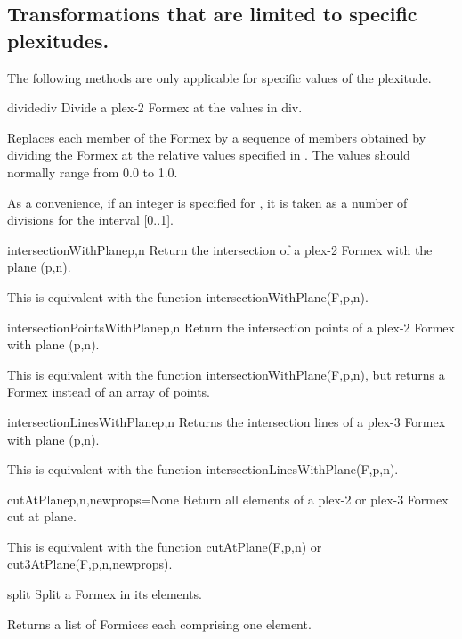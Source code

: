 \subsection{Transformations that are limited to specific plexitudes.}
The following methods are only applicable for specific values of the plexitude.


\begin{methoddesc}{divide}{div}
Divide a plex-2 Formex at the values in div.

Replaces each member of the Formex  by a sequence of members obtained
by dividing the Formex at the relative values specified in . The values
should normally range from 0.0 to 1.0.
    
As a convenience, if an integer is specified for , it is taken as a
number of divisions for the interval [0..1].
\end{methoddesc}

\begin{methoddesc}{intersectionWithPlane}{p,n}
  Return the intersection of a plex-2 Formex with the plane (p,n).
  
  This is equivalent with the function intersectionWithPlane(F,p,n).
\end{methoddesc}
    
\begin{methoddesc}{intersectionPointsWithPlane}{p,n}
  Return the intersection points of a plex-2 Formex with plane (p,n).
    
  This is equivalent with the function intersectionWithPlane(F,p,n),
  but returns a Formex instead of an array of points.
\end{methoddesc}

\begin{methoddesc}{intersectionLinesWithPlane}{p,n}
  Returns the intersection lines of a plex-3 Formex with plane (p,n).
  
  This is equivalent with the function intersectionLinesWithPlane(F,p,n).
\end{methoddesc}

\begin{methoddesc}{cutAtPlane}{p,n,newprops=None}
  Return all elements of a plex-2 or plex-3 Formex cut at plane.
  
  This is equivalent with the function cutAtPlane(F,p,n) or
  cut3AtPlane(F,p,n,newprops).
\end{methoddesc}
 
\begin{methoddesc}{split}{}
  Split a Formex in its elements.
  
  Returns a list of Formices each comprising one element.
\end{methoddesc}

